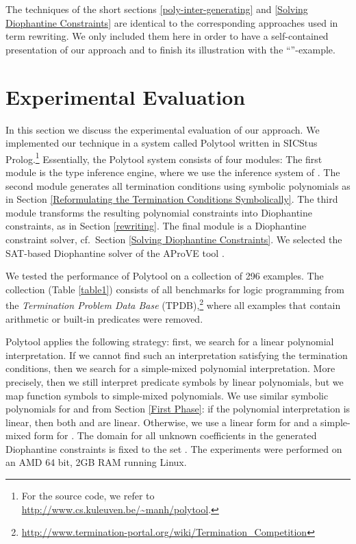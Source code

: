 \documentclass[envcountsame]{tlp}
\newcounter{ex:der-lastsymconsctr}
\begin{document}
The techniques of the short sections \ref{poly-inter-generating} and \ref{Solving Diophantine
Constraints}
are identical to the corresponding approaches 
used in term rewriting. We only included them here in order
to have a self-contained presentation of our approach
and to finish its illustration with the ``''-example.

\section{Experimental Evaluation}
\label{sec:experiment} 


In this section we discuss the experimental evaluation of our
approach. We implemented our technique in a system called \textsf{Polytool} 
\cite{Nguyen&DeSchreye06} written in \textsf{SICStus Prolog}.\footnote{For the
source code, we refer to \url{http://www.cs.kuleuven.be/~manh/polytool}.} 
Essentially, the \textsf{Polytool} system consists of four modules:
The
first module is the type inference engine,
where we use the
inference
system of 
\cite{GallagherHB05}.
The second module 
generates all termination conditions using symbolic polynomials
as in Section \ref{Reformulating 
the Termination Conditions Symbolically}. 
The third module transforms the resulting polynomial constraints 
into Diophantine constraints, as in Section
\ref{rewriting}. 
The final module is a Diophantine
constraint solver, cf.\ Section \ref{Solving Diophantine Constraints}. 
We selected the SAT-based Diophantine solver \cite{Fuhsc07} 
of the \textsf{AProVE} tool \cite{Giesletal06}.







We tested the performance of \textsf{Polytool} on 
a collection of 296 examples. The collection (Table
\ref{table1}) consists of all
benchmarks for logic programming from the \emph{Termination Problem
Data Base} (TPDB),\footnote{\url{http://www.termination-portal.org/wiki/Termination_Competition}}
where all examples that contain arithmetic or
built-in predicates were removed.  




{\sf Polytool} applies the following strategy:
first, we search for a linear polynomial interpretation. If
we cannot find such an interpretation satisfying the termination conditions,
then we 
search for a simple-mixed polynomial interpretation. More precisely, then we
still interpret predicate symbols by linear polynomials, but we map function
symbols to simple-mixed polynomials.
We use
  similar symbolic polynomials for 
 and  from
Section \ref{First Phase}: if the polynomial interpretation is linear, 
  then both  and  are linear. Otherwise, we use a linear
form for  and a simple-mixed form for . 
The domain for all
unknown coefficients in the generated Diophantine constraints is fixed to the set
.
The experiments were performed 
on an AMD 64 bit, 2GB RAM running Linux.
\end{document}
